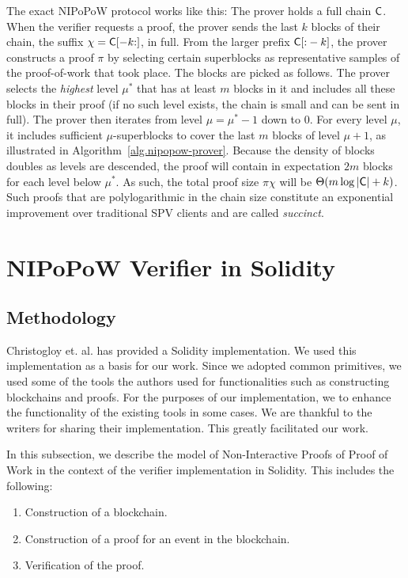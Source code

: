 The exact NIPoPoW protocol works like this: The prover holds a full chain
$\mathsf{C}$. When the verifier requests a proof, the prover sends the last $k$
blocks of their chain, the suffix $\chi = \mathsf{C}[-k{:}]$, in full. From the
larger prefix $\mathsf{C}[{:}-k]$, the prover constructs a proof $\pi$ by selecting
certain superblocks as representative samples of the proof-of-work that took
place. The blocks are picked as follows. The prover selects the \emph{highest}
level $\mu^*$ that has at least $m$ blocks in it and includes all these blocks
in their proof (if no such level exists, the chain is small and can be sent in
full). The prover then iterates from level $\mu = \mu^* - 1$ down to $0$. For
every level $\mu$, it includes sufficient $\mu$-superblocks to cover the last
$m$ blocks of level $\mu + 1$, as illustrated in
Algorithm~\ref{alg.nipopow-prover}. Because the density of blocks doubles as
levels are descended, the proof will contain in expectation $2m$ blocks for each
level below $\mu^*$. As such, the total proof size $\pi \chi$ will be
$\Theta(m\log|\mathsf{C}| + k)$. Such proofs that are polylogarithmic in the chain
size constitute an exponential improvement over traditional SPV clients and are
called \emph{succinct}.

\section{NIPoPoW Verifier in Solidity}

\subsection{Methodology}

Christogloy et. al. has provided a Solidity implementation. We used this
implementation as a basis for our work. Since we adopted common primitives, we
used some of the tools the authors used for functionalities such as
constructing blockchains and proofs. For the purposes of our implementation, we
to enhance the functionality of the existing tools in some cases. We are
thankful to the writers for sharing their implementation. This greatly
facilitated our work.

In this subsection, we describe the model of Non-Interactive Proofs of Proof of
Work in the context of the verifier implementation in Solidity. This includes
the following:

\begin{enumerate}
  \item
    Construction of a blockchain.
  \item
    Construction of a proof for an event in the blockchain.
  \item
    Verification of the proof.
\end{enumerate}

